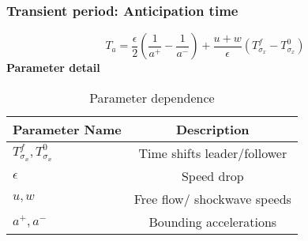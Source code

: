 
\begin{frame}
    \frametitle{Transient period: Anticipation time}
    \begin{equation*}
      T_a = \frac{\epsilon}{2}\left(\frac{1}{a^+}- \frac{1}{a^-}\right) + \frac{u+w}{\epsilon}(T^f_{\sigma_x}-T^{0}_{\sigma_x})
    \end{equation*}
    \textbf{Parameter detail}
    \begin{table}
      \begin{tabular}{l | c }
      Parameter Name & Description \\
      \hline \hline
      \(T^f_{\sigma_x}, T^0_{\sigma_x}\)  & Time shifts leader/follower   \\ 
      \(\epsilon\) & Speed drop \\
      \(u,w\) & Free flow/ shockwave speeds \\
      \(a^+,a^-\) & Bounding accelerations
      \end{tabular}
      \caption{Parameter dependence}
    \end{table}
  \end{frame}